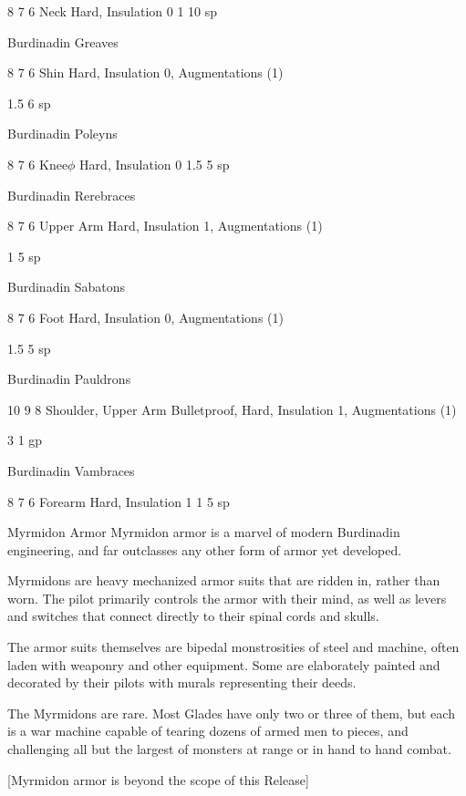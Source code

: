\documentclass[oneside,11pt,english]{book}
\begin{document}
8 7 6 Neck Hard, Insulation 0 1 10 
sp 

Burdinadin 
Greaves 

8 7 6 Shin Hard, Insulation 0, Augmentations 
(1) 

1.5 6 sp 

Burdinadin 
Poleyns 

8 7 6 Knee$\phi$ Hard, Insulation 0 1.5 5 sp 

Burdinadin 
Rerebraces 

8 7 6 Upper Arm Hard, Insulation 1, Augmentations 
(1) 

1 5 sp 

Burdinadin 
Sabatons 

8 7 6 Foot Hard, Insulation 0, Augmentations 
(1) 

1.5 5 sp 

Burdinadin 
Pauldrons 

10 9 8 Shoulder, Upper Arm Bulletproof, Hard, Insulation 1, 
Augmentations (1) 

3 1 gp 

Burdinadin 
Vambraces 

8 7 6 Forearm Hard, Insulation 1 1 5 sp 

 

 

Myrmidon Armor 
Myrmidon armor is a marvel of modern Burdinadin engineering, and far outclasses any other form of 
armor yet developed. 

 

Myrmidons are heavy mechanized armor suits that are ridden in, rather than worn. The pilot primarily 
controls the armor with their mind, as well as levers and switches that connect directly to their spinal 
cords and skulls. 

 

The armor suits themselves are bipedal monstrosities of steel and machine, often laden with weaponry 
and other equipment. Some are elaborately painted and decorated by their pilots with murals representing 
their deeds. 

 

The Myrmidons are rare. Most Glades have only two or three of them, but each is a war machine capable 
of tearing dozens of armed men to pieces, and challenging all but the largest of monsters at range or in 
hand to hand combat. 

 


[Myrmidon armor is beyond the scope of this Release] 

 
\end{document}
